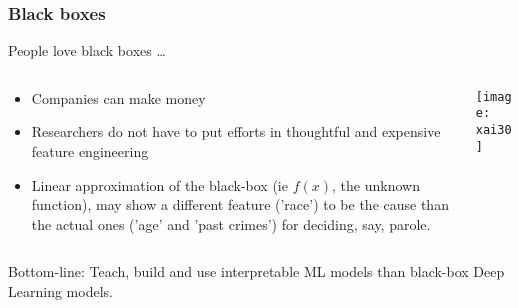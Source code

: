 \begin{frame}[fragile]\frametitle{Black boxes}

People love black boxes \ldots

\begin{columns}
    \begin{column}[T]{0.6\linewidth}
		
			\begin{itemize}
			\item Companies can make money
			\item Researchers do not have to put efforts in thoughtful and expensive feature engineering
			\item Linear approximation of the black-box (ie $f(x)$, the unknown function), may show a different feature ('race') to be the cause than the actual ones ('age' and 'past crimes') for deciding, say, parole.
			\end{itemize}
						
    \end{column}
    \begin{column}[T]{0.4\linewidth}

      \begin{center}
      \texttt{[image: xai30]}
	  	\end{center}
    \end{column}
  \end{columns}
	
	


Bottom-line: Teach, build and use interpretable ML models than black-box Deep Learning models.

\end{frame}
